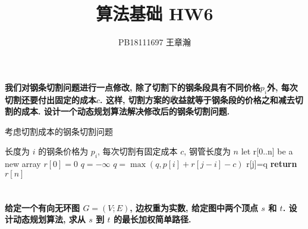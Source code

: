\documentclass[UTF8]{article}
\title{算法基础 HW6}
\author{PB18111697 王章瀚}
\begin{document}
\maketitle
\section{}
\noindent \textbf{我们对钢条切割问题进行一点修改, 除了切割下的钢条段具有不同价格$p_i$外, 每次切割还要付出固定的成本$c$. 这样, 切割方案的收益就等于钢条段的价格之和减去切割的成本. 设计一个动态规划算法解决修改后的钢条切割问题.}

\begin{minipage}{\linewidth*6/7}
	\begin{algorithm}[H]
		\caption{考虑切割成本的钢条切割问题}
		\begin{algorithmic}[1] %
			\Require 长度为 $i$ 的钢条价格为 $p_i$, 每次切割有固定成本 $c$, 钢管长度为 $n$
			\State let r[0..n] be a new array
			\State $r[0]=0$
				\State $q=-\infty$
					\State $q=\max(q,p[i]+r[j-i]-c)$ 
				\EndFor
				\State r[j]=q
			\EndFor
			\State \textbf{return} $r[n]$
			\EndFunction
		\end{algorithmic}
	\end{algorithm}
\end{minipage}

\newpage
\section{}
\noindent \textbf{给定一个有向无环图 $G=(V;E)$, 边权重为实数, 给定图中两个顶点 $s$ 和 $t$. 设计动态规划算法, 求从 $s$ 到 $t$ 的最长加权简单路径.}
\end{document}
